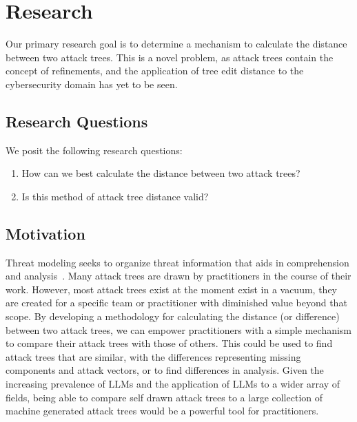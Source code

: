 
\section{Research}

Our primary research goal is to determine a mechanism to calculate the distance between two attack trees. This is a novel problem, as attack trees contain the concept of refinements, and the application of tree edit distance to the cybersecurity domain has yet to be seen.

\subsection{Research Questions}

We posit the following research questions:

\begin{enumerate}
    \item[\RQ{1}] How can we best calculate the distance between two attack trees?
\item[\RQ{2}] Is this method of attack tree distance valid?
\end{enumerate}

\subsection{Motivation}


Threat modeling seeks to organize threat information that aids in comprehension and analysis~\cite{andersonSecurityEngineeringGuide2020,schneierSecretsLiesDigital2000}. Many attack trees are drawn by practitioners in the course of their work. However, most attack trees exist at the moment exist in a vacuum, they are created for a specific team or practitioner with diminished value beyond that scope. By developing a methodology for calculating the distance (or difference) between two attack trees, we can empower practitioners with a simple mechanism to compare their attack trees with those of others. This could be used to find attack trees that are similar, with the differences representing missing components and attack vectors, or to find differences in analysis. Given the increasing prevalence of LLMs and the application of LLMs to a wider array of fields, being able to compare self drawn attack trees to a large collection of machine generated attack trees would be a powerful tool for practitioners.



